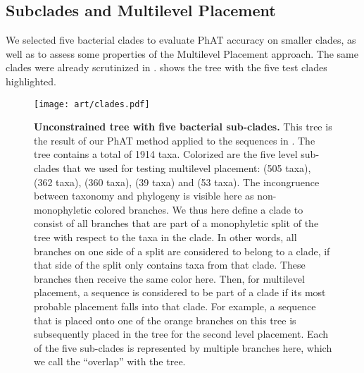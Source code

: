 \subsection{Subclades and Multilevel Placement}
\label{ch:AutomaticTrees:sec:Evaluation:sub:MultilevelPlacement}

We selected five bacterial clades to evaluate \ac{PhAT} accuracy on smaller clades,
as well as to assess some properties of the Multilevel Placement approach.
The same clades were already scrutinized in  \citep{Kozlov2016}.
 shows the  tree with the five test clades highlighted.


\begin{figure}[hpbt]
    \centering
    \texttt{[image: art/clades.pdf]}
    \vspace*{0.5em}
    \caption[Unconstrained  tree with five bacterial sub-clades]{
        \textbf{Unconstrained  tree with five bacterial sub-clades.}
        This tree is the result of our \ac{PhAT} method
        applied to the  sequences in .
        The tree contains a total of 1914 taxa.
        Colorized are the five  level sub-clades that we used for testing multilevel placement:
         (505 taxa),  (362 taxa),  (360 taxa),
         (39 taxa) and  (53 taxa).
        The incongruence between taxonomy and phylogeny is visible here as non-monophyletic colored branches.
        We thus here define a clade to consist of all branches
        that are part of a monophyletic split of the tree with respect to the taxa in the clade.
        In other words, all branches on one side of a split are considered to belong to a clade,
        if that side of the split only contains taxa from that clade.
        These branches then receive the same color here.
        Then, for multilevel placement, a sequence is considered to be part of a clade
        if its most probable placement falls into that clade.
        For example, a sequence that is placed onto one of the orange branches on this tree
        is subsequently placed in the  tree for the second level placement.
        Each of the five sub-clades is represented by multiple branches here,
        which we call the ``overlap'' with the  tree.
    }
    \label{fig:clades}
\end{figure}

